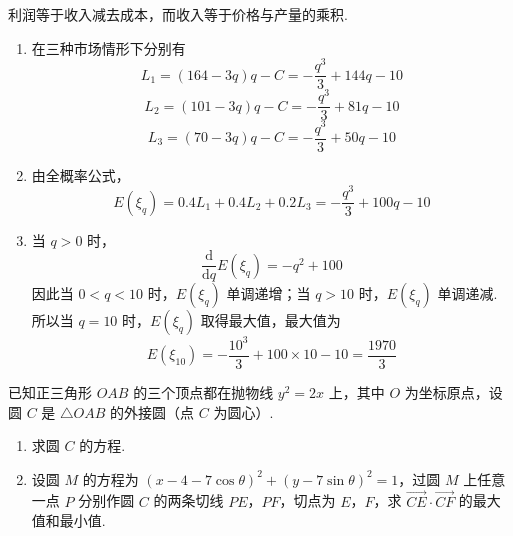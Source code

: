 \begin{solution}
利润等于收入减去成本，而收入等于价格与产量的乘积.

\begin{enumerate}
\item 在三种市场情形下分别有
\[
L_{1}=(164-3q)q-C=-\frac{q^{3}}{3}+144q-10
\]
\[
L_{2}=(101-3q)q-C=-\frac{q^{3}}{3}+81q-10
\]
\[
L_{3}=(70-3q)q-C=-\frac{q^{3}}{3}+50q-10
\]
\item 由全概率公式，
\[
E(\xi_q)=0.4L_{1}+0.4L_{2}+0.2L_{3}=-\frac{q^{3}}{3}+100q-10
\]
\item 当 \(q>0\) 时，
\[
\frac{\mathrm{d}}{\mathrm{d}q}E(\xi_q)=-q^{2}+100
\]
因此当 \(0<q<10\) 时，\(E(\xi_q)\) 单调递增；当 \(q>10\) 时，\(E(\xi_q)\) 单调递减. 所以当 \(q=10\) 时，\(E(\xi_q)\) 取得最大值，最大值为
\[
E(\xi_{10})=-\frac{10^{3}}{3}+100\times10-10=\frac{1970}{3}
\]
\end{enumerate}
\end{solution}

\begin{problem}
已知正三角形 \(OAB\) 的三个顶点都在抛物线 \(y^{2} = 2x\) 上，其中 \(O\) 为坐标原点，设圆 \(C\) 是 \(\triangle OAB\) 的外接圆（点 \(C\) 为圆心）.

\begin{enumerate}
\item 求圆 \(C\) 的方程.
\item 设圆 \(M\) 的方程为 \((x - 4 - 7\cos \theta)^2 + (y - 7\sin \theta)^2 = 1\)，过圆 \(M\) 上任意一点 \(P\) 分别作圆 \(C\) 的两条切线 \(PE\)，\(PF\)，切点为 \(E\)，\(F\)，求 \(\overrightarrow{CE} \cdot \overrightarrow{CF}\) 的最大值和最小值.
\end{enumerate}
\end{problem}

